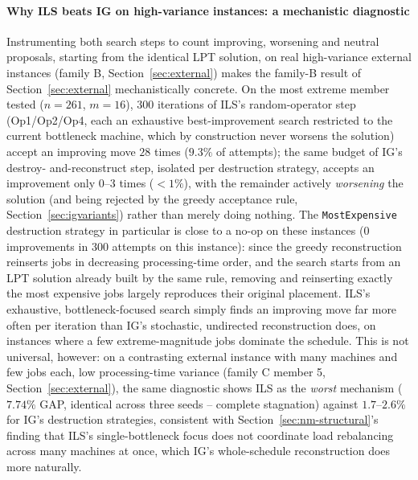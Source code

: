 \documentclass[final,3p,times,11pt,authoryear]{elsarticle}
\begin{document}
\paragraph{Why ILS beats IG on high-variance instances: a mechanistic
diagnostic} Instrumenting both search steps to count improving,
worsening and neutral proposals, starting from the identical LPT
solution, on real high-variance external instances (family B,
Section~\ref{sec:external}) makes the family-B result of
Section~\ref{sec:external} mechanistically concrete. On the most
extreme member tested ($n=261$, $m=16$), $300$ iterations of ILS's
random-operator step (Op1/Op2/Op4, each an exhaustive best-improvement
search restricted to the current bottleneck machine, which by
construction never worsens the solution) accept an improving move
$28$ times ($9.3\%$ of attempts); the same budget of IG's destroy-%
and-reconstruct step, isolated per destruction strategy, accepts an
improvement only $0$--$3$ times ($<1\%$), with the remainder actively
\emph{worsening} the solution (and being rejected by the greedy
acceptance rule, Section~\ref{sec:igvariants}) rather than merely
doing nothing. The \texttt{MostExpensive} destruction strategy in
particular is close to a no-op on these instances ($0$ improvements
in $300$ attempts on this instance): since the greedy reconstruction
reinserts jobs in decreasing processing-time order, and the search
starts from an LPT solution already built by the same rule, removing
and reinserting exactly the most expensive jobs largely reproduces
their original placement. ILS's exhaustive, bottleneck-focused search
simply finds an improving move far more often per iteration than IG's
stochastic, undirected reconstruction does, on instances where a few
extreme-magnitude jobs dominate the schedule. This is not universal,
however: on a contrasting external instance with many machines and
few jobs each, low processing-time variance (family C member 5,
Section~\ref{sec:external}), the same diagnostic shows ILS as the
\emph{worst} mechanism ($7.74\%$ GAP, identical across three seeds --
complete stagnation) against $1.7$--$2.6\%$ for IG's destruction
strategies, consistent with Section~\ref{sec:nm-structural}'s finding
that ILS's single-bottleneck focus does not coordinate load
rebalancing across many machines at once, which IG's whole-schedule
reconstruction does more naturally.
\end{document}

